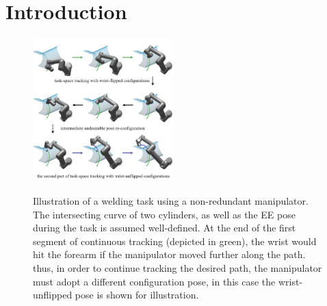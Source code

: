 \documentclass[letterpaper, 10 pt, journal, twoside]{ieeetran}  %
\begin{document}
\section{Introduction}


\begin{figure}[t]
\centering
\includegraphics[width=0.48\textwidth]{figures/fig1/fig1_2}\label{fig:zerosolution}
\caption{Illustration of a welding task using a non-redundant manipulator. The intersecting curve of two cylinders, as well as the EE pose during the task is assumed well-defined. 
At the end of the first segment of continuous tracking (depicted in green), the wrist would hit the forearm if the manipulator moved further along the path. thus, in order to continue tracking the desired path, the manipulator must adopt a different configuration pose, in this case the wrist-unflipped pose is shown for illustration.}
\label{fig:demo1}
\vspace{-0.4cm}
\end{figure}
\end{document}
